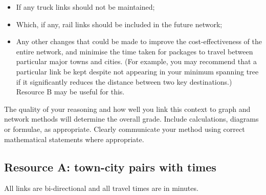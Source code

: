 \begin{enumerate}
\begin{itemize}
          \item If any truck links should not be maintained;
          \item Which, if any, rail links should be included in the future network;
          \item Any other changes that could be made to improve the cost-effectiveness of the entire network, and minimise the
                time taken for packages to travel between particular major towns and cities. (For example, you may recommend that
                a particular link be kept despite not appearing in your minimum spanning tree if it significantly reduces the distance
                between two key destinations.) Resource B may be useful for this.
        \end{itemize}
\end{enumerate}
The quality of your reasoning and how well you link this context to graph and network methods will determine the overall grade. Include calculations,
diagrams or formulae, as appropriate. Clearly communicate your method using correct mathematical statements where appropriate.

\subsection*{Resource A: town-city pairs with times}
All links are bi-directional and all travel times are in minutes.

